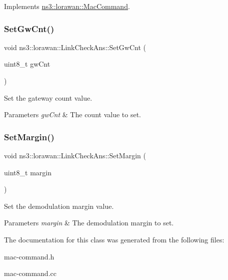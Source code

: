 Implements \hyperlink{classns3_1_1lorawan_1_1MacCommand_a0ed44b33942ddc3dc9694dc06ab0b87f}{ns3\+::lorawan\+::\+Mac\+Command}.

\mbox{\label{classns3_1_1lorawan_1_1LinkCheckAns_afb84d89f6fa26b9f26250c54120d8f44}} 
\subsubsection{\texorpdfstring{Set\+Gw\+Cnt()}{SetGwCnt()}}
{\footnotesize\ttfamily void ns3\+::lorawan\+::\+Link\+Check\+Ans\+::\+Set\+Gw\+Cnt (\begin{DoxyParamCaption}\item[{uint8\+\_\+t}]{gw\+Cnt }\end{DoxyParamCaption})}

Set the gateway count value.


\begin{DoxyParams}{Parameters}
{\em gw\+Cnt} & The count value to set. \\
\hline
\end{DoxyParams}
\mbox{\label{classns3_1_1lorawan_1_1LinkCheckAns_af217ee3fe5287862f914c04a752672c2}} 
\subsubsection{\texorpdfstring{Set\+Margin()}{SetMargin()}}
{\footnotesize\ttfamily void ns3\+::lorawan\+::\+Link\+Check\+Ans\+::\+Set\+Margin (\begin{DoxyParamCaption}\item[{uint8\+\_\+t}]{margin }\end{DoxyParamCaption})}

Set the demodulation margin value.


\begin{DoxyParams}{Parameters}
{\em margin} & The demodulation margin to set. \\
\hline
\end{DoxyParams}


The documentation for this class was generated from the following files\+:\begin{DoxyCompactItemize}
\item 
mac-\/command.\+h\item 
mac-\/command.\+cc\end{DoxyCompactItemize}
